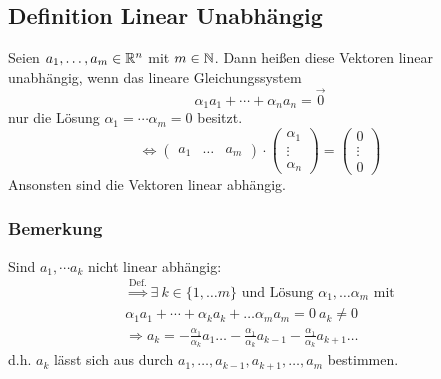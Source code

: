 \subsection{Definition Linear Unabhängig}
Seien $a_1, \ldots, a_m \in \mathbb{R}^n$ mit $m\in \mathbb{N}$. Dann heißen diese Vektoren
linear unabhängig, wenn das lineare Gleichungssystem
\begin{equation*}
    \alpha_1 a_1 + \cdots + \alpha_n a_n = \vec{0}
\end{equation*}
nur die Lösung $\alpha_1 = \cdots \alpha_m = 0$ besitzt.
\begin{equation*}
    \Leftrightarrow
        \begin{pmatrix}
            a_1 & \ldots & a_m
        \end{pmatrix}
        \cdot
        \begin{pmatrix}
            \alpha_1 \\
            \vdots \\
            \alpha_n
        \end{pmatrix}
        =
        \begin{pmatrix}
            0 \\
            \vdots \\
            0
        \end{pmatrix}
\end{equation*}
Ansonsten sind die Vektoren linear abhängig.

\subsubsection{Bemerkung}
Sind $a_1, \cdots a_k$ nicht linear abhängig:
\begin{eqnarray*}
    \stackrel{\text{Def.}}{\Rightarrow} \exists\ k \in \{1, \ldots m\} \text{ und
    Lösung } \alpha_1, \ldots \alpha_m \text{ mit}\\
    \alpha_1 a_1 + \cdots + \alpha_k a_k + \ldots \alpha_m a_m = 0\ a_k \neq 0\\
    \Rightarrow a_k = -\frac{\alpha_1}{\alpha_k} a_1 \ldots -\frac{\alpha_1}{\alpha_k} a_{k-1}
    -\frac{\alpha_1}{\alpha_k} a_{k+1} \ldots
\end{eqnarray*}
d.h. $a_k$ lässt sich aus durch $a_1, \ldots, a_{k-1}, a_{k+1}, \ldots, a_m$
bestimmen.

